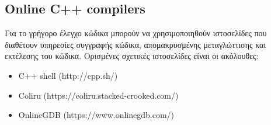 %

\subsection*{Online C++ compilers}
Για το γρήγορο έλεγχο κώδικα μπορούν να χρησιμοποιηθούν ιστοσελίδες που διαθέτουν υπηρεσίες συγγραφής κώδικα, απομακρυσμένης μεταγλώττισης και εκτέλεσης του κώδικα. Ορισμένες σχετικές ιστοσελίδες είναι οι ακόλουθες:
\begin{itemize}
\item C++ shell (http://cpp.sh/)
\item Coliru (https://coliru.stacked-crooked.com/)
\item OnlineGDB (https://www.onlinegdb.com/)
\end{itemize}  


